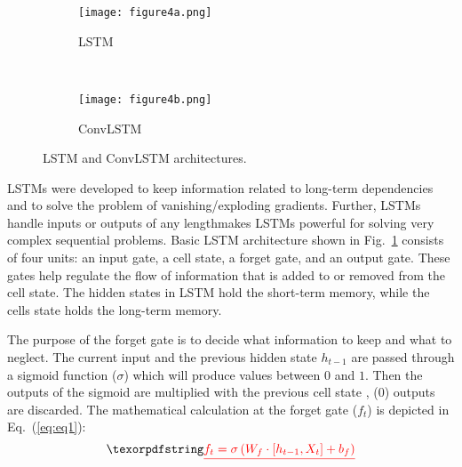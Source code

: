 \begin{figure} [!h]
	\centering
	\begin{subfigure}[b]{1\textwidth}
		\centering
		\DIFdelbeginFL %
\DIFdelendFL \DIFaddbeginFL \texttt{[image: figure4a.png]}
		\DIFaddendFL \caption{LSTM}
		\label{fig:LSTM}
	\end{subfigure}
	\\ 
	\hfill
	\begin{subfigure}[b]{1\textwidth}
		\centering
		\DIFdelbeginFL %
\DIFdelendFL \DIFaddbeginFL \texttt{[image: figure4b.png]}
		\DIFaddendFL \caption{ConvLSTM}
		\label{fig:ConvLSTM}	
	\end{subfigure}
	\caption{LSTM and ConvLSTM architectures.}
	\label{fig:lstm_convlstm}
\end{figure}

LSTMs were developed to keep information related to long-term dependencies \DIFdelbegin \DIFdel{, }\DIFdelend and to solve the problem of vanishing/exploding gradients.
Further, LSTMs handle inputs or outputs of any length\DIFdelbegin {}\DIFdelend \DIFaddbegin {}\DIFaddend makes LSTMs powerful for solving very complex sequential problems. 
Basic LSTM architecture shown in Fig.~\ref{fig:LSTM}  consists of four units: an input gate, a cell state, a forget gate, and an output gate.
These gates help regulate the flow of information that is added to or removed from the cell state. 
The hidden states in LSTM hold the short-term memory, while the cells state holds the long-term memory.

The purpose of the forget gate is to decide what information to keep and what to neglect. 
The current input \DIFdelbegin {}\DIFdelend \DIFaddbegin {}\DIFaddend and the previous hidden state  \(h_{t-1}\) are passed through a sigmoid function (\(\sigma\)) which will produce values between \(0\) and \(1\).
Then the outputs of the sigmoid are multiplied with the previous cell state \DIFdelbegin {}\DIFdelend \DIFaddbegin {}\DIFaddend , (\(0\)) outputs are discarded.
The mathematical calculation at the forget gate ($f_t$) is depicted in Eq.~(\ref{eq:eq1}):
\DIFdelbegin \begin{displaymath}
\DIFdel{f_{t}=\sigma\left(W_{f} \cdot\left[h_{t-1}, X_{t}\right]+b_{f}\right)
}\end{displaymath}%
\DIFdelend \DIFaddbegin 

